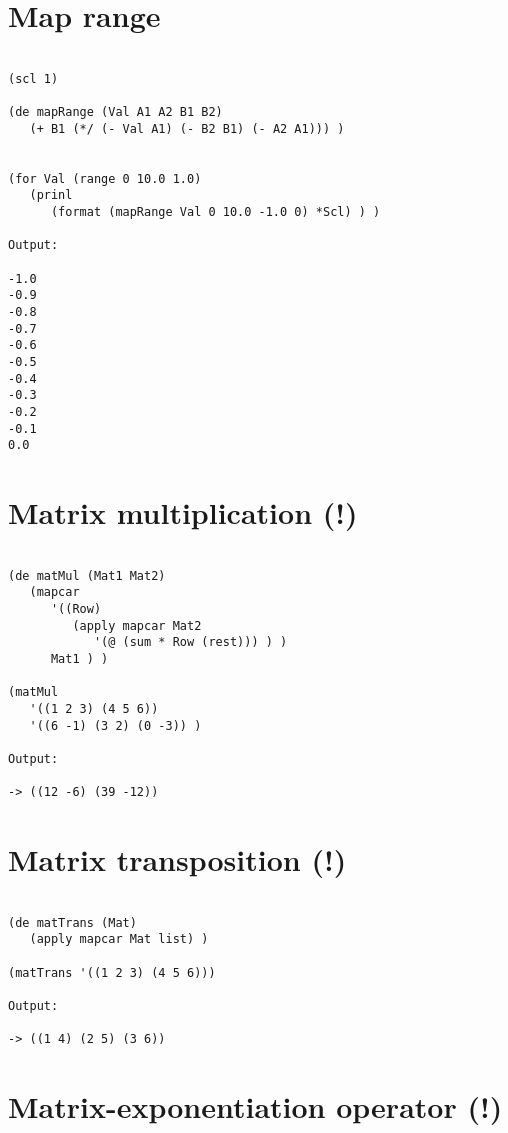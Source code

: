 \section*{Map range}

\begin{verbatim}

(scl 1)

(de mapRange (Val A1 A2 B1 B2)
   (+ B1 (*/ (- Val A1) (- B2 B1) (- A2 A1))) )


(for Val (range 0 10.0 1.0)
   (prinl
      (format (mapRange Val 0 10.0 -1.0 0) *Scl) ) )

Output:

-1.0
-0.9
-0.8
-0.7
-0.6
-0.5
-0.4
-0.3
-0.2
-0.1
0.0

\end{verbatim}

\section*{Matrix multiplication (!)}

\begin{verbatim}

(de matMul (Mat1 Mat2)
   (mapcar
      '((Row)
         (apply mapcar Mat2
            '(@ (sum * Row (rest))) ) )
      Mat1 ) )

(matMul
   '((1 2 3) (4 5 6))
   '((6 -1) (3 2) (0 -3)) )

Output:

-> ((12 -6) (39 -12))

\end{verbatim}

\section*{Matrix transposition (!)}

\begin{verbatim}

(de matTrans (Mat)
   (apply mapcar Mat list) )

(matTrans '((1 2 3) (4 5 6)))

Output:

-> ((1 4) (2 5) (3 6))

\end{verbatim}

\section*{Matrix-exponentiation operator (!)}

